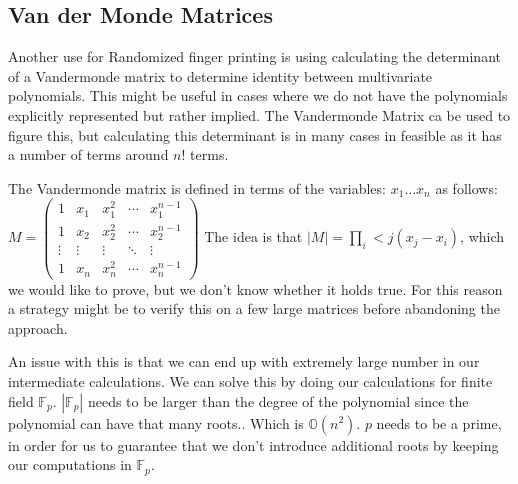 \documentclass{report}
\newcommand{\+}[1]{\ensuremath{\boldsymbol{#1}}}
\begin{document}
\subsection{Van der Monde Matrices}
Another use for Randomized finger printing is using calculating the determinant of a Vandermonde matrix to determine identity between multivariate polynomials. This might be useful in cases where we do not have the polynomials explicitly represented but rather implied.
The Vandermonde Matrix ca be used to figure this, but calculating this determinant is in many cases in feasible as it has a number of terms around $n!$ terms.
\par
The Vandermonde matrix is defined in terms of the variables: $x_1 \ldots x_n$ as follows:\\
$M = \begin{pmatrix}
  1 & x_1 & x_1^2 & \cdots & x_1^{n-1} \\
  1 & x_2 & x_2^2 & \cdots & x_2^{n-1}\\
  \vdots & \vdots & \vdots & \ddots & \vdots \\
  1 & x_n & x_n^2 & \cdots & x_n^{n-1}
\end{pmatrix}
$
The idea is that $|M| =\prod_i<j (x_j - x_i)$, which we would like to prove, but we don't know whether it holds true.
For this reason a strategy might be to verify this on a few large matrices before abandoning the approach.
\par
An issue with this is that we can end up with extremely large number in our intermediate calculations. We can solve this by doing our calculations for finite field $\mathbb{F}_p$. $|\mathbb{F}_p|$ needs to be larger than the degree of the polynomial since the polynomial can have that many roots.. Which is $\mathbb{O}(n^2)$. $p$ needs to be a prime, in order for us to guarantee that we don't introduce additional roots by keeping our computations in $\mathbb{F}_p$.
\end{document}
